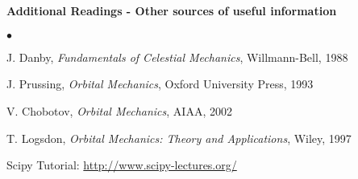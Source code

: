 \documentclass[10pt]{article}
\begin{document}
\paragraph*{Additional Readings - Other sources of useful information}
\begin{list}
{$\bullet$}
{\setlength{\itemsep}{-3pt}}
\item {}
\item {}
\item J. Danby, \textit{Fundamentals of Celestial Mechanics}, Willmann-Bell, 1988
\item J. Prussing, \textit{Orbital Mechanics}, Oxford University Press, 1993
\item V. Chobotov, \textit{Orbital Mechanics}, AIAA, 2002
\item T. Logsdon, \textit{Orbital Mechanics: Theory and Applications}, Wiley, 1997
\item Scipy Tutorial: \href{http://www.scipy-lectures.org/}{http://www.scipy-lectures.org/}
\end{list}
\end{document}

